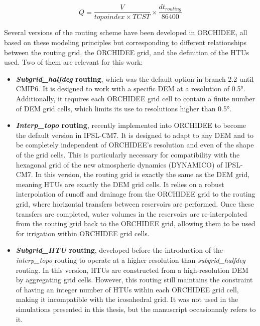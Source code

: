 \begin{equation}
    Q = \frac{V}{topoindex \times TCST} \times \frac{dt_{routing}}{86400}
\end{equation}

Several versions of the routing scheme have been developed in ORCHIDEE, all based on these modeling principles but corresponding to different relationships between the routing grid, the ORCHIDEE grid, and the definition of the HTUs used. Two of them are relevant for this work:

\begin{itemize}
\item \textbf{\textit{Subgrid\_halfdeg} routing}, which was the default option in branch 2.2 until CMIP6. It is designed to work with a specific DEM at a resolution of 0.5°. Additionally, it requires each ORCHIDEE grid cell to contain a finite number of DEM grid cells, which limits its use to resolutions higher than 0.5°.

\item \textbf{\textit{Interp\_topo} routing}, recently implemented into ORCHIDEE to become the default version in IPSL-CM7. It is designed to adapt to any DEM and to be completely independent of ORCHIDEE’s resolution and even of the shape of the grid cells. This is particularly necessary for compatibility with the hexagonal grid of the new atmospheric dynamics (DYNAMICO) of IPSL-CM7.
In this version, the routing grid is exactly the same as the DEM grid, meaning HTUs are exactly the DEM grid cells. It relies on a robust interpolation of runoff and drainage from the ORCHIDEE grid to the routing grid, where horizontal transfers between reservoirs are performed. Once these transfers are completed, water volumes in the reservoirs are re-interpolated from the routing grid back to the ORCHIDEE grid, allowing them to be used for irrigation within ORCHIDEE grid cells.

\item \textbf{\textit{Subgrid\_HTU} routing}, developed before the introduction of the \textit{interp\_topo} routing to operate at a higher resolution than \textit{subgrid\_halfdeg} routing. In this version, HTUs are constructed from a high-resolution DEM by aggregating grid cells. However, this routing still maintains the constraint of having an integer number of HTUs within each ORCHIDEE grid cell, making it incompatible with the icosahedral grid. It was not used in the simulations presented in this thesis, but the manuscript occasionnaly refers to it.
\end{itemize}


